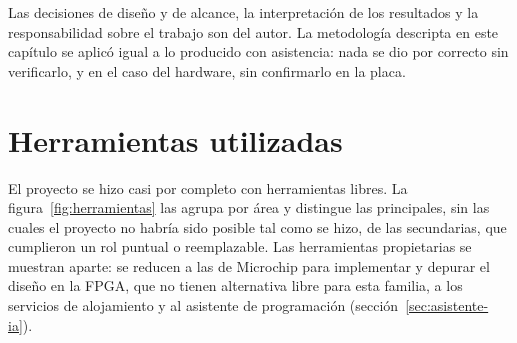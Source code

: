 Las decisiones de diseño y de alcance, la interpretación de los resultados y
la responsabilidad sobre el trabajo son del autor. La metodología descripta en
este capítulo se aplicó igual a lo producido con asistencia: nada se dio por
correcto sin verificarlo, y en el caso del hardware, sin confirmarlo en la
placa.

\section{Herramientas utilizadas}
\label{sec:herramientas}

El proyecto se hizo casi por completo con herramientas libres. La
figura~\ref{fig:herramientas} las agrupa por área y distingue las
principales, sin las cuales el proyecto no habría sido posible tal como se
hizo, de las secundarias, que cumplieron un rol puntual o reemplazable. Las
herramientas propietarias se muestran aparte: se reducen a las de Microchip
para implementar y depurar el diseño en la FPGA, que no tienen alternativa
libre para esta familia, a los servicios de alojamiento y al asistente de
programación (sección~\ref{sec:asistente-ia}).

